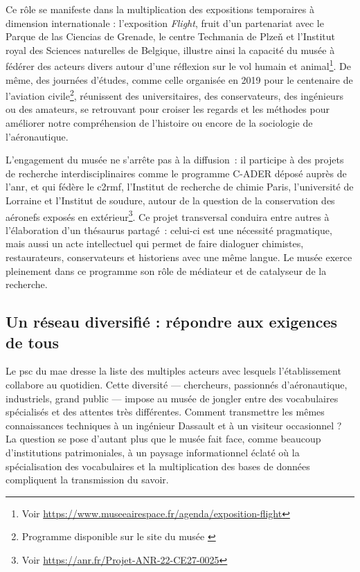 Ce rôle se manifeste dans la multiplication des expositions temporaires à dimension internationale : l’exposition \emph{Flight}, fruit d’un partenariat avec le Parque de las Ciencias de Grenade, le centre Techmania de Plzeň et l’Institut royal des Sciences naturelles de Belgique, illustre ainsi la capacité du musée à fédérer des acteurs divers autour d’une réflexion sur le vol humain et animal\footnote{Voir \href{https://www.museeairespace.fr/agenda/exposition-flight}{https://www.museeairespace.fr/agenda/exposition-flight}}. De même, des journées d’études, comme celle organisée en 2019 pour le centenaire de l’aviation civile\footnote{Programme disponible sur le site du musée \cite{19192019CentAns}}, réunissent des universitaires, des conservateurs, des ingénieurs ou des amateurs, se retrouvant pour croiser les regards et les méthodes pour améliorer notre compréhension de l'histoire ou encore de la sociologie de l'aéronautique.

L’engagement du musée ne s’arrête pas à la diffusion : il participe à des projets de recherche interdisciplinaires comme le programme C-ADER déposé auprès de l'\ac{anr}, et qui fédère le \ac{c2rmf}, l’Institut de recherche de chimie Paris, l’université de Lorraine et l’Institut de soudure, autour de la  question de la conservation des aéronefs exposés en extérieur\footnote{Voir  \href{https://anr.fr/Projet-ANR-22-CE27-0025}{https://anr.fr/Projet-ANR-22-CE27-0025}}. Ce projet transversal conduira entre autres à l’élaboration d’un thésaurus partagé : celui-ci est une nécessité pragmatique, mais aussi un acte intellectuel qui permet de faire dialoguer chimistes, restaurateurs, conservateurs et historiens avec une même langue. Le musée exerce pleinement dans ce programme son rôle de médiateur et de catalyseur de la recherche.
\subsection{Un réseau diversifié : répondre aux exigences de tous}

Le \ac{psc} du \ac{mae} dresse la liste des multiples acteurs avec lesquels l'établissement collabore au quotidien. Cette diversité — chercheurs, passionnés d'aéronautique, industriels, grand public — impose au musée de jongler entre des vocabulaires spécialisés et des attentes très différentes. Comment transmettre les mêmes connaissances techniques à un ingénieur Dassault et à un visiteur occasionnel ? La question se pose d'autant plus que le musée fait face, comme beaucoup d'institutions patrimoniales, à un paysage informationnel éclaté où la spécialisation des vocabulaires et la multiplication des bases de données compliquent la transmission du savoir.

